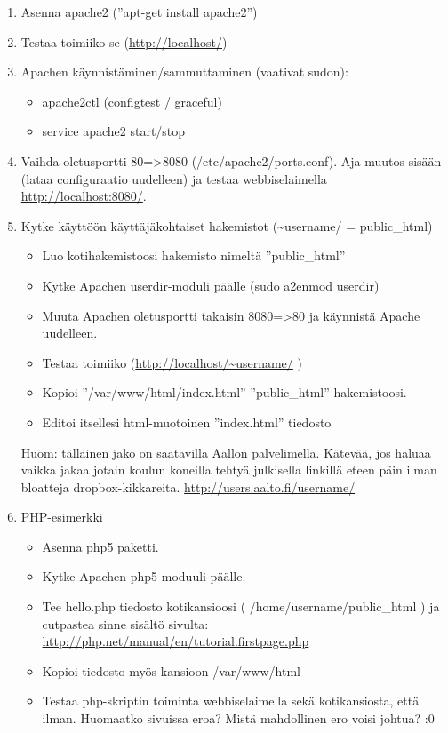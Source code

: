 \documentclass[12pt,portrait,a4]{article}
\begin{document}
\begin{enumerate}
\item Asenna apache2 (''apt-get install apache2'')
\item Testaa toimiiko se (\url{http://localhost/})
\item Apachen käynnistäminen/sammuttaminen (vaativat sudon):
	\begin{itemize}
	\item apache2ctl (configtest / graceful)
	\item service apache2 start/stop
	\end{itemize}
\item Vaihda oletusportti 80=\textgreater 8080 (/etc/apache2/ports.conf).  Aja muutos sisään (lataa configuraatio uudelleen) ja testaa webbiselaimella \url{http://localhost:8080/}.
\item Kytke käyttöön käyttäjäkohtaiset hakemistot (\textasciitilde username/ = public\_html)
	\begin{itemize}
	\item Luo kotihakemistoosi hakemisto nimeltä ''public\_html''
	\item Kytke Apachen userdir-moduli päälle (sudo a2enmod userdir)
	\item Muuta Apachen oletusportti takaisin 8080=\textgreater 80 ja käynnistä Apache uudelleen.
	\item Testaa toimiiko (\url{http://localhost/~username/} )
	\item Kopioi ''/var/www/html/index.html'' ''public\_html'' hakemistoosi.
	\item Editoi itsellesi html-muotoinen ''index.html'' tiedosto
	\end{itemize}

Huom: tällainen jako on saatavilla Aallon palvelimella. Kätevää, jos haluaa vaikka jakaa jotain koulun koneilla tehtyä julkisella linkillä eteen päin ilman bloatteja dropbox-kikkareita.
\url{http://users.aalto.fi/username/}


\item PHP-esimerkki
	\begin{itemize}
	\item Asenna php5 paketti.
	\item Kytke Apachen php5 moduuli päälle.
	\item Tee hello.php tiedosto kotikansioosi ( /home/username/public\_html ) ja cutpastea sinne sisältö sivulta:
\url{http://php.net/manual/en/tutorial.firstpage.php}
	\item Kopioi tiedosto myös kansioon /var/www/html
	\item Testaa php-skriptin toiminta webbiselaimella sekä kotikansiosta, että ilman. Huomaatko sivuissa eroa? Mistä mahdollinen ero voisi johtua? :0
	\end{itemize}
\end{enumerate}
\end{document}

